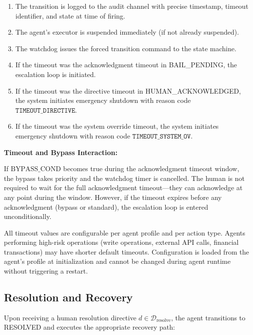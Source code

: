 \begin{enumerate}
  \item The transition is logged to the audit channel with precise timestamp, timeout identifier, and state at time of firing.
  \item The agent's executor is suspended immediately (if not already suspended).
  \item The watchdog issues the forced transition command to the state machine.
  \item If the timeout was the acknowledgment timeout in BAIL\_PENDING, the escalation loop is initiated.
  \item If the timeout was the directive timeout in HUMAN\_ACKNOWLEDGED, the system initiates emergency shutdown with reason code $\texttt{TIMEOUT\_DIRECTIVE}$.
  \item If the timeout was the system override timeout, the system initiates emergency shutdown with reason code $\texttt{TIMEOUT\_SYSTEM\_OV}$.
\end{enumerate}

\medskip\noindent\textbf{Timeout and Bypass Interaction:}

If $\text{BYPASS\_COND}$ becomes true during the acknowledgment timeout window, the bypass takes priority and the watchdog timer is cancelled. The human is not required to wait for the full acknowledgment timeout---they can acknowledge at any point during the window. However, if the timeout expires before any acknowledgment (bypass or standard), the escalation loop is entered unconditionally.

All timeout values are configurable per agent profile and per action type. Agents performing high-risk operations (write operations, external API calls, financial transactions) may have shorter default timeouts. Configuration is loaded from the agent's profile at initialization and cannot be changed during agent runtime without triggering a restart.

\subsection{Resolution and Recovery}

Upon receiving a human resolution directive $d \in \mathcal{D}_{\text{resolve}}$, the agent transitions to RESOLVED and executes the appropriate recovery path:

